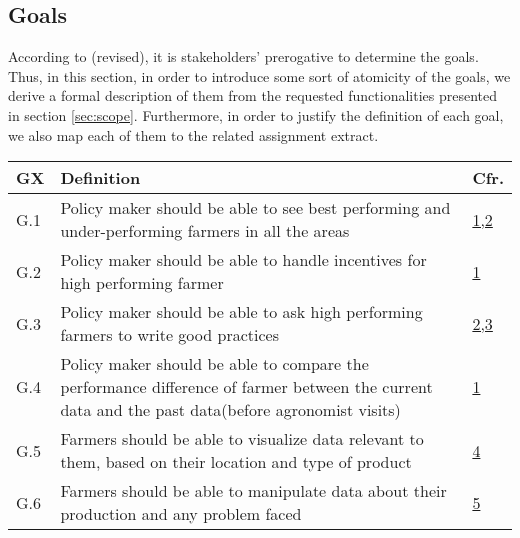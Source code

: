 \newpage

\subsection{Goals}
\label{sec:goals}
According to \cite{jackson_dsfr} (revised), it is stakeholders' prerogative to determine the goals. Thus, in this section, in order to introduce some sort of atomicity of the goals, we derive a formal description of them from the requested functionalities presented in section \ref{sec:scope}. Furthermore, in order to justify the definition of each goal, we also map each of them to the related assignment extract.

\begin{table}[H]
    \setlength\arrayrulewidth{1pt}
    \centering
    \begin{tabular}{|l|m{}|l|}
        \rowcolor{myblue}
        \hline
        \color{white}GX & \color{white}Definition   & \color{white}Cfr.\\
        \hline
        G.1                                               &     Policy maker should be able to see best performing and under-performing farmers in all the areas &   \hyperref[sec:policyMakersNeeds]{1,2} \\
        \hline
        G.2                                                      &  Policy maker should be able to handle incentives for high performing farmer   &    \hyperref[sec:policyMakersNeeds]{1}\\
        \hline
        G.3                                     &   Policy maker should be able to ask high performing farmers to write good practices   &   \hyperref[sec:policyMakersNeeds]{2,3} \\
        \hline
        G.4                                              &   Policy maker should be able to compare the performance difference of farmer between the current data and the past data(before agronomist visits)     &   \hyperref[sec:policyMakersNeeds]{1} \\
        \hline
        G.5                                  &   Farmers should be able to visualize data relevant to them, based on their location and type of product   &   \hyperref[sec:farmersNeeds]{4} \\
        \hline
        G.6                                                      &  Farmers should be able to manipulate data about their production and any problem faced   &    \hyperref[sec:farmersNeeds]{5}\\%

\end{tabular}
\end{table}
